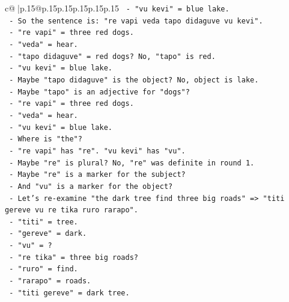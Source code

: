 \documentclass{article}
\begin{document}
{\begin{supertabular}{c@{$\;$}|p{.15\linewidth}@{}p{.15\linewidth}p{.15\linewidth}p{.15\linewidth}p{.15\linewidth}p{.15\linewidth}}
{{{\texttt{                       {-} "vu kevi" = blue lake.} \\
\texttt{                       {-} So the sentence is: "re vapi veda tapo didaguve vu kevi".} \\
\texttt{                       {-} "re vapi" = three red dogs.} \\
\texttt{                       {-} "veda" = hear.} \\
\texttt{                       {-} "tapo didaguve" = red dogs? No, "tapo" is red.} \\
\texttt{                       {-} "vu kevi" = blue lake.} \\
\texttt{                       {-} Maybe "tapo didaguve" is the object? No, object is lake.} \\
\texttt{                       {-} Maybe "tapo" is an adjective for "dogs"?} \\
\texttt{                       {-} "re vapi" = three red dogs.} \\
\texttt{                       {-} "veda" = hear.} \\
\texttt{                       {-} "vu kevi" = blue lake.} \\
\texttt{                       {-} Where is "the"?} \\
\texttt{                       {-} "re vapi" has "re". "vu kevi" has "vu".} \\
\texttt{                       {-} Maybe "re" is plural? No, "re" was definite in round 1.} \\
\texttt{                       {-} Maybe "re" is a marker for the subject?} \\
\texttt{                       {-} And "vu" is a marker for the object?} \\
\texttt{                       {-} Let's re{-}examine "the dark tree find three big roads" => "titi gereve vu re tika ruro rarapo".} \\
\texttt{                         {-} "titi" = tree.} \\
\texttt{                         {-} "gereve" = dark.} \\
\texttt{                         {-} "vu" = ?} \\
\texttt{                         {-} "re tika" = three big roads?} \\
\texttt{                         {-} "ruro" = find.} \\
\texttt{                         {-} "rarapo" = roads.} \\
\texttt{                         {-} "titi gereve" = dark tree.} \\
}}}
\end{supertabular}}
\end{document}
